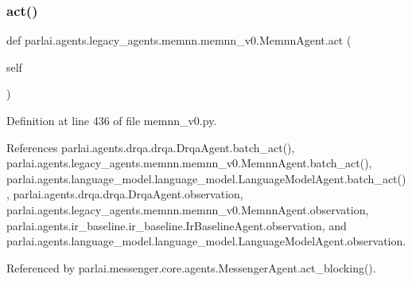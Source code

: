\subsubsection{\texorpdfstring{act()}{act()}}
{\footnotesize\ttfamily def parlai.\+agents.\+legacy\+\_\+agents.\+memnn.\+memnn\+\_\+v0.\+Memnn\+Agent.\+act (\begin{DoxyParamCaption}\item[{}]{self }\end{DoxyParamCaption})}



Definition at line 436 of file memnn\+\_\+v0.\+py.



References parlai.\+agents.\+drqa.\+drqa.\+Drqa\+Agent.\+batch\+\_\+act(), parlai.\+agents.\+legacy\+\_\+agents.\+memnn.\+memnn\+\_\+v0.\+Memnn\+Agent.\+batch\+\_\+act(), parlai.\+agents.\+language\+\_\+model.\+language\+\_\+model.\+Language\+Model\+Agent.\+batch\+\_\+act(), parlai.\+agents.\+drqa.\+drqa.\+Drqa\+Agent.\+observation, parlai.\+agents.\+legacy\+\_\+agents.\+memnn.\+memnn\+\_\+v0.\+Memnn\+Agent.\+observation, parlai.\+agents.\+ir\+\_\+baseline.\+ir\+\_\+baseline.\+Ir\+Baseline\+Agent.\+observation, and parlai.\+agents.\+language\+\_\+model.\+language\+\_\+model.\+Language\+Model\+Agent.\+observation.



Referenced by parlai.\+messenger.\+core.\+agents.\+Messenger\+Agent.\+act\+\_\+blocking().

